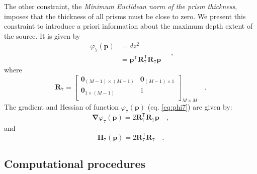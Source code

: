 The other constraint, the \textit{Minimum Euclidean norm of the prism thickness}, imposes that the thickness of all prisms must be close to zero. We present this constraint to introduce a priori information about the maximum depth extent of the source. It is given by
\begin{equation}\label{eq:phi7}
\begin{split}
\varphi_{7}(\mathbf{p}) &= dz^2 \\
&= \mathbf{p}^{\mathsf{T}} \mathbf{R}_{7}^{\mathsf{T}} \mathbf{R}_{7} \mathbf{p}
\end{split} \quad ,
\end{equation}
where
\begin{equation}
\mathbf{R}_{7} =
\begin{bmatrix}
\mathbf{0}_{(M-1) \times (M-1)} & \mathbf{0}_{(M-1) \times 1} \\
\mathbf{0}_{1 \times (M-1)} & 1 \\
\end{bmatrix}_{ M \times M } \quad .
\end{equation}
The gradient and Hessian of function $\varphi_{7}(\mathbf{p})$ (eq. \ref{eq:phi7}) are given by:
\begin{equation}\label{eq:phi7_grad}
\boldsymbol{\nabla}\varphi_{7}(\mathbf{p}) = 2 \mathbf{R}_{7}^{\mathsf{T}} \mathbf{R}_{7} \mathbf{p} \quad ,
\end{equation}
and
\begin{equation}\label{eq:phi7_hessian}
\mathbf{H}_{7}(\mathbf{p}) = 2 \mathbf{R}^{\mathsf{T}}_{7}\mathbf{R}_{7} \quad .
\end{equation}

\subsection{Computational procedures}

